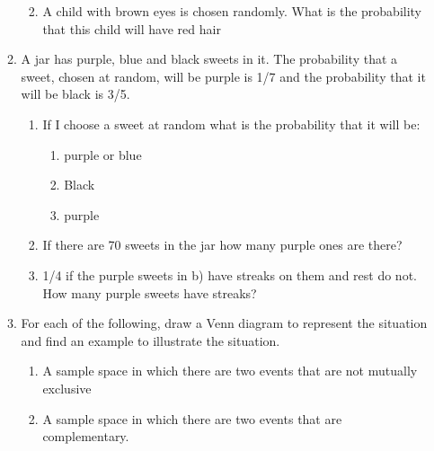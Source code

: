 \begin{enumerate}[noitemsep, label=\textbf{\arabic*}. ]
\begin{enumerate}[noitemsep, label=\textbf{\alph*}. ]
\begin{enumerate}[noitemsep, label=\textbf{\arabic*}. ]
%     
        \label{m39373*uid136}\item A child with brown eyes is chosen
randomly. What is the probability that this child will have red hair
\end{enumerate}
                \label{m39373*uid137}\item A jar has purple, blue and black sweets in it. The
probability that a sweet, chosen at random, will be purple is 1/7 and the
probability that it will be black is 3/5.
\label{m39373*id116346}\begin{enumerate}[noitemsep, label=\textbf{\alph*}. ] 
            \label{m39373*uid138}\item If I choose a sweet at random what
is the probability that it will be:
\label{m39373*id116362}\begin{enumerate}[noitemsep, label=\textbf{\roman*}. ] 
            \label{m39373*uid139}\item purple or blue
\label{m39373*uid140}\item Black
\label{m39373*uid141}\item purple
\end{enumerate}
        \label{m39373*uid142}\item If there are 70 sweets in the jar how
many purple ones are there?
\label{m39373*uid143}\item 1/4 if the purple sweets in b) have streaks on them and
rest do not. How many purple sweets have streaks?
\end{enumerate}
                \label{m39373*uid144}\item For each of the following, draw a Venn diagram to
represent the situation and find an example to illustrate the situation.
\label{m39373*id116443}\begin{enumerate}[noitemsep, label=\textbf{\alph*}. ] 
            \label{m39373*uid145}\item A sample space in which there are
two events that are not mutually exclusive
\label{m39373*uid146}\item A sample space in which there are two events that are
complementary.
\end{enumerate}

\end{enumerate}
\end{enumerate}
